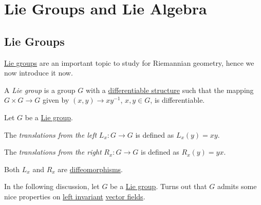 \chapter{Lie Groups and Lie Algebra}\label{ch:Lie-group-and-Lie-algebra}
\section{Lie Groups}
\hyperref[def:Lie-group]{Lie groups} are an important topic to study for Riemannian geometry, hence we now introduce it now.

\begin{definition}\label{def:Lie-group}
	A \emph{Lie group} is a group \(G\) with a \hyperref[def:smooth-structure]{differentiable structure} such that the mapping \(G \times G \to G\) given by \((x, y) \to xy^{-1} \), \(x, y\in G\), is differentiable.
\end{definition}

\begin{definition*}[Transformation]
	Let \(G\) be a \hyperref[def:Lie-group]{Lie group}.
	\begin{definition}\label{def:left-transformation}
		The \emph{translations from the left} \(L_x \colon G \to G\) is defined as \(L_x(y) = xy\).
	\end{definition}
	\begin{definition}\label{def:right-transformation}
		The \emph{translations from the right} \(R_x \colon G \to G\) is defined as \(R_x(y) = yx\).
	\end{definition}
\end{definition*}

\begin{remark}
	Both \(L_x\) and \(R_x\) are \hyperref[def:diffeomorphism]{diffeomorphisms}.
\end{remark}

In the following discussion, let \(G\) be a \hyperref[def:Lie-group]{Lie group}. Turns out that \(G\) admits some nice properties on \hyperref[def:vector-field-left-invariant]{left invariant} \hyperref[def:vector-field]{vector fields}.

